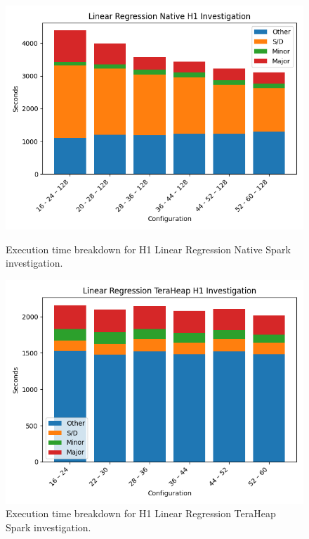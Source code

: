 \begin{figure}[thbp]
    \includegraphics[width=\linewidth]{./fig/linr_h1_native.png}
    \caption{Execution time breakdown for H1 Linear Regression Native
    Spark investigation.}
    \label{fig:linr_h1_native}

    \includegraphics[width=\linewidth]{./fig/linr_h1_th.png}
    \caption{Execution time breakdown for H1 Linear Regression
    TeraHeap Spark investigation.}
    \label{fig:linr_h1_th}
\end{figure}

